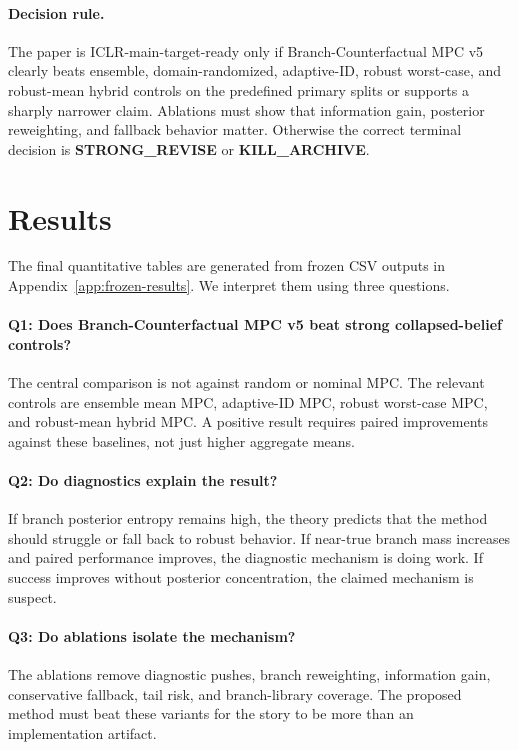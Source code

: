 \documentclass{article}
\newcommand{\methodv}{Branch-Counterfactual MPC v5}
\begin{document}
\paragraph{Decision rule.}
The paper is ICLR-main-target-ready only if \methodv{} clearly beats ensemble, domain-randomized, adaptive-ID, robust worst-case, and robust-mean hybrid controls on the predefined primary splits or supports a sharply narrower claim.  Ablations must show that information gain, posterior reweighting, and fallback behavior matter.  Otherwise the correct terminal decision is \textbf{STRONG\_REVISE} or \textbf{KILL\_ARCHIVE}.

\section{Results}

The final quantitative tables are generated from frozen CSV outputs in Appendix~\ref{app:frozen-results}.  We interpret them using three questions.

\paragraph{Q1: Does \methodv{} beat strong collapsed-belief controls?}
The central comparison is not against random or nominal MPC.  The relevant controls are ensemble mean MPC, adaptive-ID MPC, robust worst-case MPC, and robust-mean hybrid MPC.  A positive result requires paired improvements against these baselines, not just higher aggregate means.

\paragraph{Q2: Do diagnostics explain the result?}
If branch posterior entropy remains high, the theory predicts that the method should struggle or fall back to robust behavior.  If near-true branch mass increases and paired performance improves, the diagnostic mechanism is doing work.  If success improves without posterior concentration, the claimed mechanism is suspect.

\paragraph{Q3: Do ablations isolate the mechanism?}
The ablations remove diagnostic pushes, branch reweighting, information gain, conservative fallback, tail risk, and branch-library coverage.  The proposed method must beat these variants for the story to be more than an implementation artifact.
\end{document}
